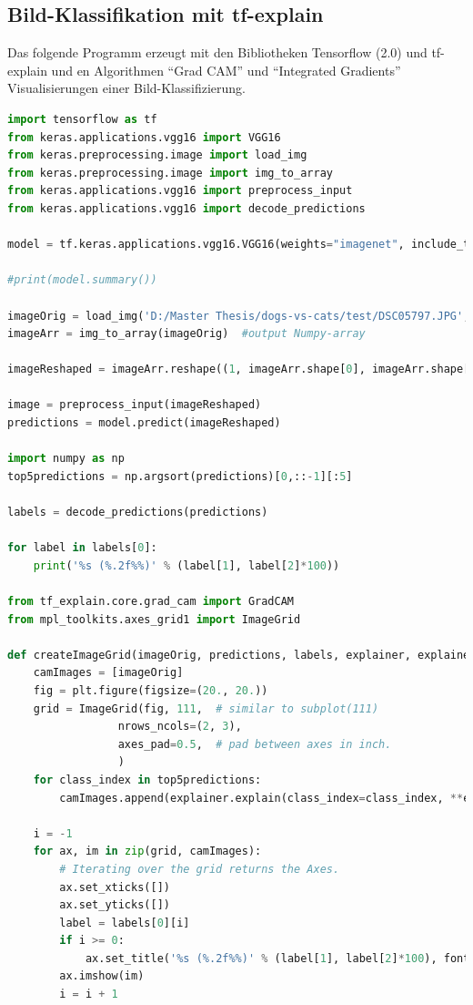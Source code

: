 \documentclass[
  12pt, %
  a4paper, %
  oneside, %
  openany, 
  numbers=noenddot, %
  BCOR=5mm, %
  parskip=half*, %
  thesis, %
]{bfhbook}
\begin{document}
\subsection*{Bild-Klassifikation mit tf-explain}
Das folgende Programm erzeugt mit den Bibliotheken Tensorflow (2.0) und tf-explain und en Algorithmen ``Grad CAM'' und ``Integrated Gradients'' Visualisierungen einer Bild-Klassifizierung. 
\begin{lstlisting}[language=Python, caption=Visualisiertes Neuronales Netz mit Tensorflow und tf-explain]
import tensorflow as tf
from keras.applications.vgg16 import VGG16
from keras.preprocessing.image import load_img
from keras.preprocessing.image import img_to_array
from keras.applications.vgg16 import preprocess_input
from keras.applications.vgg16 import decode_predictions

model = tf.keras.applications.vgg16.VGG16(weights="imagenet", include_top=True)

#print(model.summary())

imageOrig = load_img('D:/Master Thesis/dogs-vs-cats/test/DSC05797.JPG', target_size=(224, 224))
imageArr = img_to_array(imageOrig)  #output Numpy-array

imageReshaped = imageArr.reshape((1, imageArr.shape[0], imageArr.shape[1], imageArr.shape[2]))

image = preprocess_input(imageReshaped)
predictions = model.predict(imageReshaped)

import numpy as np
top5predictions = np.argsort(predictions)[0,::-1][:5]

labels = decode_predictions(predictions)

for label in labels[0]:
    print('%s (%.2f%%)' % (label[1], label[2]*100))
    
from tf_explain.core.grad_cam import GradCAM
from mpl_toolkits.axes_grid1 import ImageGrid

def createImageGrid(imageOrig, predictions, labels, explainer, explainerArgs):
    camImages = [imageOrig]
    fig = plt.figure(figsize=(20., 20.))
    grid = ImageGrid(fig, 111,  # similar to subplot(111)
                 nrows_ncols=(2, 3),
                 axes_pad=0.5,  # pad between axes in inch.
                 )
    for class_index in top5predictions:
        camImages.append(explainer.explain(class_index=class_index, **explainerArgs))
    
    i = -1
    for ax, im in zip(grid, camImages):
        # Iterating over the grid returns the Axes.
        ax.set_xticks([])
        ax.set_yticks([])
        label = labels[0][i]
        if i >= 0:
            ax.set_title('%s (%.2f%%)' % (label[1], label[2]*100), fontsize=20)
        ax.imshow(im)
        i = i + 1


\end{lstlisting}
\end{document}
